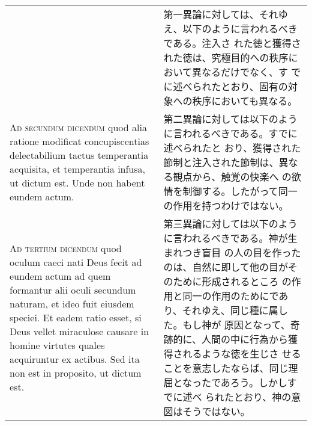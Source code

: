 \documentclass[10pt]{jsarticle}
\begin{document}
\begin{longtable}{p{21em}p{21em}}
&

 第一異論に対しては、それゆえ、以下のように言われるべきである。注入さ
 れた徳と獲得された徳は、究極目的への秩序において異なるだけでなく、す
 でに述べられたとおり、固有の対象への秩序においても異なる。
 
\\




{\scshape Ad secundum dicendum} quod alia ratione modificat
concupiscentias delectabilium tactus temperantia acquisita, et
temperantia infusa, ut dictum est. Unde non habent eundem actum.

&

 第二異論に対しては以下のように言われるべきである。すでに述べられたと
 おり、獲得された節制と注入された節制は、異なる観点から、触覚の快楽へ
 の欲情を制御する。したがって同一の作用を持つわけではない。
 
\\




{\scshape Ad tertium dicendum} quod oculum caeci nati Deus fecit ad
eundem actum ad quem formantur alii oculi secundum naturam, et ideo
fuit eiusdem speciei. Et eadem ratio esset, si Deus vellet miraculose
causare in homine virtutes quales acquiruntur ex actibus. Sed ita non
est in proposito, ut dictum est.

 &

 第三異論に対しては以下のように言われるべきである。神が生まれつき盲目
 の人の目を作ったのは、自然に即して他の目がそのために形成されるところ
 の作用と同一の作用のためにであり、それゆえ、同じ種に属した。もし神が
 原因となって、奇跡的に、人間の中に行為から獲得されるような徳を生じさ
 せることを意志したならば、同じ理屈となったであろう。しかしすでに述べ
 られたとおり、神の意図はそうではない。
 
\end{longtable}
\end{document}
